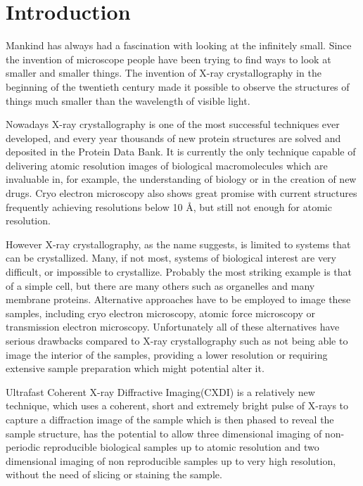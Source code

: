 \chapter{Introduction}\label{introduction}\noindent

Mankind has always had a fascination with looking at the infinitely
small. Since the invention of microscope people have been trying to find ways to
look at smaller and smaller things. The invention of X-ray crystallography in
the beginning of the twentieth century made it possible to observe the
structures of things much smaller than the wavelength of visible light.

Nowadays X-ray crystallography is one of the most successful techniques ever
developed, and every year thousands of new protein structures are solved and deposited
in the Protein Data Bank. It is currently the only technique capable of
delivering atomic resolution images of biological macromolecules which are
invaluable in, for example, the understanding of biology or in the creation of
new drugs. Cryo electron microscopy also shows great promise with current
structures frequently achieving resolutions below 10 \AA, but still not enough
for atomic resolution.

However X-ray crystallography, as the name suggests, is limited to systems that
can be crystallized. Many, if not most, systems of biological interest are very
difficult, or impossible to crystallize. Probably the most striking example is
that of a simple cell, but there are many others such as organelles and many
membrane proteins. Alternative approaches have to be employed to image these
samples, including cryo electron microscopy, atomic force microscopy or
transmission electron microscopy. Unfortunately all of these alternatives have
serious drawbacks compared to X-ray crystallography such as not being able to
image the interior of the samples, providing a lower resolution or requiring
extensive sample preparation which might potential alter it.

Ultrafast Coherent X-ray Diffractive Imaging(CXDI) is a relatively new
technique, which uses a coherent, short and extremely
bright pulse of X-rays to capture a diffraction image of the sample which is
then phased to reveal the sample structure, has the potential to allow three
dimensional imaging of non-periodic reproducible biological samples up to atomic
resolution and two dimensional imaging of non reproducible samples up to
very high resolution, without the need of slicing or staining the sample.

